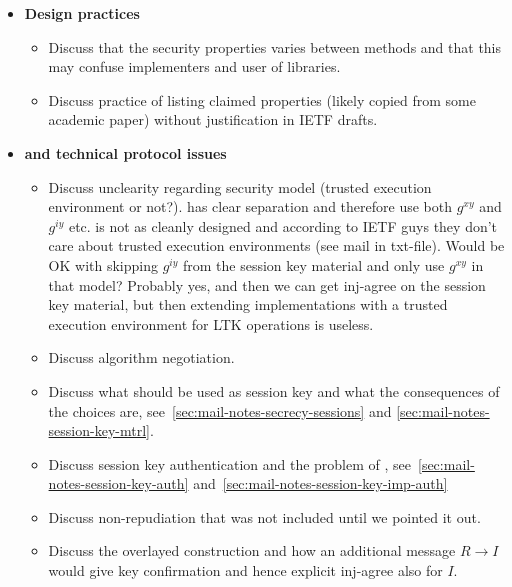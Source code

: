 \documentclass[runningheads]{llncs}
\begin{document}
{\begin{itemize}
\begin{itemize}
            \item{\textbf{Design practices}}
                \begin{itemize}
                \item Discuss that the security properties varies between methods
                and that this may confuse implementers and user of libraries.
                \item Discuss practice of listing claimed properties (likely copied
                from some academic paper) without justification in IETF drafts.
                \end{itemize}
            \item{\textbf{\mGiy and technical protocol issues}}
                \begin{itemize}
                \item Discuss unclearity regarding security model (trusted execution
                environment or not?). \mOptls has clear separation and therefore
                use both $g^{xy}$ and $g^{iy}$ etc. \mEdhoc is not as cleanly
                designed and according to IETF guys they don't care about
                trusted execution environments (see mail in txt-file).
                Would \mEdhoc be OK with skipping $g^{iy}$ from the session key
                material and only use $g^{xy}$ in that model? Probably yes, and
                then we can get inj-agree on the session key material, but then
                extending \mEdhoc implementations with a trusted execution
                environment for LTK operations is useless.
                \item Discuss algorithm negotiation.
                \item Discuss what should be used as session key and what the
                consequences of the choices are,
                see~\ref{sec:mail-notes-secrecy-sessions} and
                \ref{sec:mail-notes-session-key-mtrl}.
                \item Discuss session key authentication and the problem of \mGiy,
                see~\ref{sec:mail-notes-session-key-auth}
                and~\ref{sec:mail-notes-session-key-imp-auth}
                \item Discuss non-repudiation that was not included until we pointed
                it out.
                \item Discuss the overlayed \mOptls construction and how an
                additional \mOscore message $R \rightarrow I$ would give key
                confirmation and hence explicit inj-agree also for $I$.

\end{itemize}
\end{itemize}
\end{itemize}}
\end{document}
